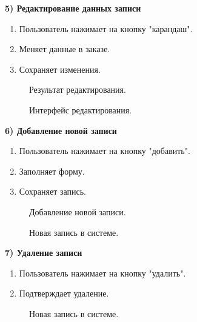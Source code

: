 \textbf{5) Редактирование данных записи}
\begin{enumerate}
\item Пользователь нажимает на кнопку "карандаш".
\item Меняет данные в заказе.
\item Сохраняет изменения.
\end{enumerate}

\begin{figure}[ht]
	\caption{Результат редактирования.}
	\label{storedf:edit1}
\end{figure}

\begin{figure}[ht]
	\caption{Интерфейс редактирования.}
	\label{stored:edit0}
\end{figure}

\clearpage

\textbf{6) Добавление новой записи}
\begin{enumerate}
	\item Пользователь нажимает на кнопку "добавить".
	\item Заполняет форму.
	\item Сохраняет запись.
\end{enumerate}

\begin{figure}[ht]
	\caption{Добавление новой записи.}
	\label{stored:addone}
\end{figure}

\begin{figure}[ht]
	\caption{Новая запись в системе.}
	\label{stored:addone1}
\end{figure}

\textbf{7) Удаление записи}
\begin{enumerate}
	\item Пользователь нажимает на кнопку "удалить".
	\item Подтверждает удаление.
\end{enumerate}

\begin{figure}[ht]
	\caption{Новая запись в системе.}
	\label{stored:delete}
\end{figure}

\clearpage

